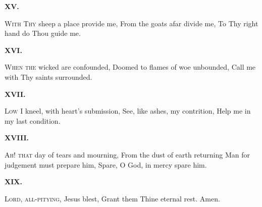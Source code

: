 \documentclass[fontsize=9, a5paper]{scrbook}
\begin{document}
\begin{volumetitlepage}
\begin{poem}
		\begin{stanza}
			\textbf{XV.}\verseline
			
			\textsc{With Thy} sheep a place provide me,\verseline
			From the goats afar divide me,\verseline
			To Thy right hand do Thou guide me. 
		\end{stanza}
	
		\begin{stanza}
			\textbf{XVI.}\verseline
			
			\textsc{When the} wicked are confounded,\verseline
			Doomed to flames of woe unbounded,\verseline
			Call me with Thy saints surrounded. 
		\end{stanza}
	
		\begin{stanza}
			\textbf{XVII.}\verseline
			
			\textsc{Low I} kneel, with heart's submission,\verseline
			See, like ashes, my contrition,\verseline
			Help me in my last condition. 
		\end{stanza}
	
		\begin{stanza}
			\textbf{XVIII.}\verseline
			
			\textsc{Ah! that} day of tears and mourning,\verseline
			From the dust of earth returning\verseline
			Man for judgement must prepare him,\verseline
			Spare, O God, in mercy spare him. 
		\end{stanza}
	
		\begin{stanza}
			\textbf{XIX.}\verseline
			
			\textsc{Lord, all-pitying,} Jesus blest,\verseline
			Grant them Thine eternal rest. Amen. 
		\end{stanza}
	\end{poem}
\end{volumetitlepage}
\end{document}
